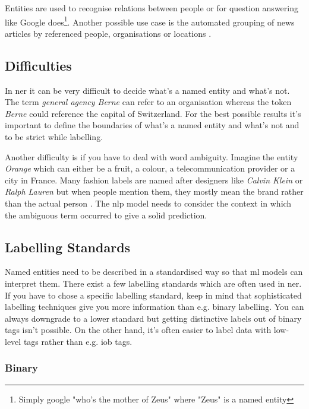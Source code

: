 Entities are used to recognise relations between people or for question answering like Google does\footnote{Simply google "who's
the mother of Zeus" where "Zeus" is a named entity}. Another possible use case is the automated grouping of news articles by
referenced people, organisations or locations \cite{gupta}.

\subsection{Difficulties}

In \acrlong{ner} it can be very difficult to decide what's a named entity and what's not. The term \emph{general agency Berne} can
refer to an organisation whereas the token \emph{Berne} could reference the capital of Switzerland. For the best possible results
it's important to define the boundaries of what's a named entity and what's not and to be strict while labelling.

Another difficulty is if you have to deal with word ambiguity. Imagine the entity \emph{Orange} which can either be a fruit, a colour,
a telecommunication provider or a city in France. Many fashion labels are named after designers like \emph{Calvin Klein} or \emph{Ralph
Lauren} but when people mention them, they mostly mean the brand rather than the actual person \cite{Vogel19}. The \acrshort{nlp} model
needs to consider the context in which the ambiguous term occurred to give a solid prediction.

\subsection{Labelling Standards}

Named entities need to be described in a standardised way so that \acrshort{ml} models can interpret them. There exist a few labelling
standards which are often used in \acrshort{ner}. If you have to chose a specific labelling standard, keep in mind that sophisticated
labelling techniques give you more information than e.g. binary labelling. You can always downgrade to a lower standard but getting
distinctive labels out of binary tags isn't possible. On the other hand, it's often easier to label data with low-level tags rather
than e.g. \acrshort{iob} tags.

\subsubsection{Binary}


